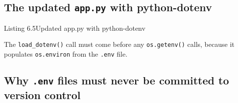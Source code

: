 \begin{codebox}[short]

\begin{Shaded}
\begin{Highlighting}[]
\end{Highlighting}
\end{Shaded}

\end{codebox}

\subsection*{\texorpdfstring{The updated \texttt{app.py} with python-dotenv}{The updated app.py with python-dotenv}}\label{06-local-dependencies:the-updated-apppy-with-python-dotenv}

\begin{codeboxcap}[short]{\textcolor{accent}{Listing 6.5}\enspace Updated app.py with python-dotenv}

\begin{Shaded}
\begin{Highlighting}[]


\OperatorTok{=}\NormalTok{)}
\OperatorTok{=}\NormalTok{, }\NormalTok{)}

\end{Highlighting}
\end{Shaded}

\end{codeboxcap}

\noindent{}The \texttt{load\_dotenv()} call must come before any \texttt{os.getenv()} calls, because it populates \texttt{os.environ} from the \texttt{.env} file.

\subsection*{\texorpdfstring{Why \texttt{.env} files must never be committed to version control}{Why .env files must never be committed to version control}}\label{06-local-dependencies:why-env-files-must-never-be-committed-to-version-control}

